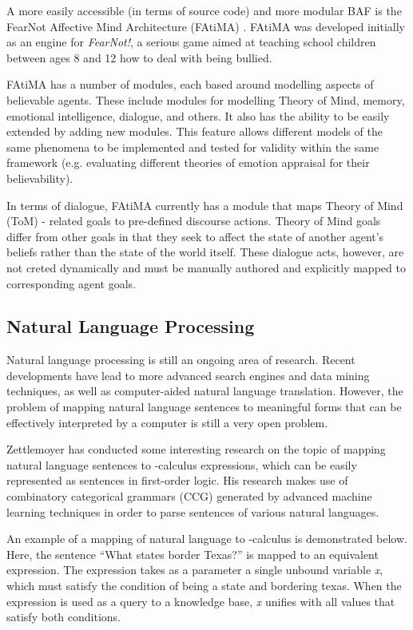 \documentclass{article}
\begin{document}
A more easily accessible (in terms of source code) and more modular
BAF is the FearNot Affective Mind Architecture (FAtiMA)
\cite{Mascarenhas}.  FAtiMA was developed initially as an engine for
\emph{FearNot!}\cite{Ecircus}, a serious game aimed at
teaching school children between ages 8 and 12 how to deal with being
bullied.

FAtiMA has a number of modules, each based around modelling aspects of
believable agents.  These include modules for modelling Theory of
Mind\cite{Marsella}, memory, emotional intelligence, dialogue, and
others.  It also has the ability to be easily extended by adding new
modules.  This feature allows different models of the same phenomena
to be implemented and tested for validity within the same framework
(e.g. evaluating different theories of emotion appraisal for their
believability).

In terms of dialogue, FAtiMA currently has a module that maps Theory
of Mind (ToM) - related goals to pre-defined discourse actions.  Theory of
Mind goals differ from other goals in that they seek to affect the
state of another agent's beliefs rather than the state of the world
itself.  These dialogue acts, however, are not creted dynamically and
must be manually authored and explicitly mapped to corresponding agent
goals.


\subsection{Natural Language Processing}

Natural language processing is still an ongoing area of research.  Recent
developments have lead to more advanced search engines and data mining 
techniques, as well as computer-aided natural language translation.  However,
the problem of mapping natural language sentences to meaningful forms that can
be effectively interpreted by a computer is still a very open problem.

Zettlemoyer \cite{Zettlemoyer2004} has conducted some interesting research
on the topic of mapping natural language sentences to \lambda-calculus
expressions, which can be easily represented as sentences in
first-order logic.  His research makes use of combinatory categorical
grammars (CCG) \cite{Steedman2003} generated by advanced machine
learning techniques in order to parse sentences of various natural
languages.

An example of a mapping of natural language to \lambda-calculus is
demonstrated below.  Here, the sentence ``What states border Texas?''
is mapped to an equivalent \lambda expression.  The expression takes as
a parameter a single unbound variable \emph{x}, which must satisfy the
condition of being a state and bordering texas.  When the expression
is used as a query to a knowledge base, \emph{x} unifies with all
values that satisfy both conditions.
\end{document}
